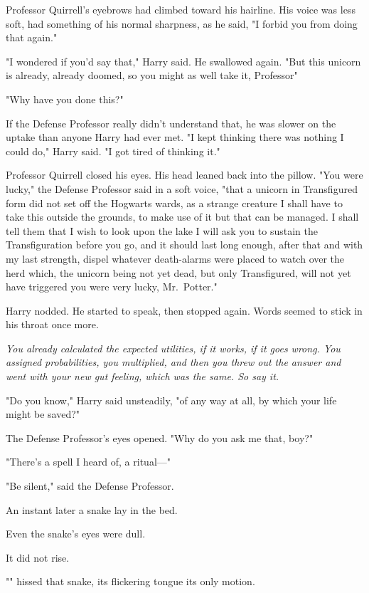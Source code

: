 Professor Quirrell's eyebrows had climbed toward his hairline. His voice was
less soft, had something of his normal sharpness, as he said, "I forbid you
from doing that again."

"I wondered if you'd say that," Harry said. He swallowed again. "But this
unicorn is already, already doomed, so you might as well take it,
Professor{\el}"

"Why have you done this?"

If the Defense Professor really didn't understand that, he was slower on the
uptake than anyone Harry had ever met. "I kept thinking there was nothing I
could do," Harry said. "I got tired of thinking it."

Professor Quirrell closed his eyes. His head leaned back into the pillow. "You
were lucky," the Defense Professor said in a soft voice, "that a unicorn in
Transfigured form{\el} did not set off the Hogwarts wards, as a strange
creature{\el} I shall have to{\el} take this outside the grounds, to make
use of it{\el} but that can be managed. I shall tell them that I wish to
look upon the lake{\el} I will ask you to sustain the Transfiguration before
you go, and it should last long enough, after that{\el} and with my last
strength, dispel whatever death-alarms were placed to watch over the
herd{\el} which, the unicorn being not yet dead, but only Transfigured, will
not yet have triggered{\el} you were very lucky, Mr.~Potter."

Harry nodded. He started to speak, then stopped again. Words seemed to stick in
his throat once more.

\emph{You already calculated the expected utilities, if it works, if it goes
wrong. You assigned probabilities, you multiplied, and then you threw out the
answer and went with your new gut feeling, which was the same. So say it.}

"Do you know," Harry said unsteadily, "of any way at all, by which your life
might be saved?"

The Defense Professor's eyes opened. "Why{\el} do you ask me that, boy?"

"There's{\el} a spell I heard of, a ritual—"

"Be silent," said the Defense Professor.

An instant later a snake lay in the bed.

Even the snake's eyes were dull.

It did not rise.

"" hissed that snake, its flickering tongue its only motion.

